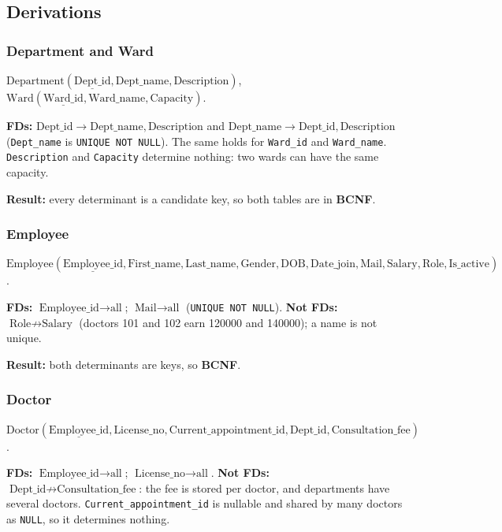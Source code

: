 \documentclass[11pt,a4paper]{article}
\newcommand{\code}[1]{\texttt{#1}}
\begin{document}
\subsection{Derivations}

\subsubsection*{Department and Ward}
$\text{Department}(\underline{\text{Dept\_id}}, \text{Dept\_name}, \text{Description})$, $\text{Ward}(\underline{\text{Ward\_id}}, \text{Ward\_name}, \text{Capacity})$.

\textbf{FDs:} $\text{Dept\_id} \rightarrow \text{Dept\_name}, \text{Description}$ and $\text{Dept\_name} \rightarrow \text{Dept\_id}, \text{Description}$ (\code{Dept\_name} is \code{UNIQUE NOT NULL}). The same holds for \code{Ward\_id} and \code{Ward\_name}. \code{Description} and \code{Capacity} determine nothing: two wards can have the same capacity.

\textbf{Result:} every determinant is a candidate key, so both tables are in \textbf{BCNF}.

\subsubsection*{Employee}
$\text{Employee}(\underline{\text{Employee\_id}}, \text{First\_name}, \text{Last\_name}, \text{Gender}, \text{DOB}, \text{Date\_join}, \text{Mail}, \text{Salary}, \text{Role}, \text{Is\_active})$.

\textbf{FDs:} $\text{Employee\_id} \rightarrow \text{all}$; $\text{Mail} \rightarrow \text{all}$ (\code{UNIQUE NOT NULL}).
\textbf{Not FDs:} $\text{Role} \nrightarrow \text{Salary}$ (doctors 101 and 102 earn 120000 and 140000); a name is not unique.

\textbf{Result:} both determinants are keys, so \textbf{BCNF}.

\subsubsection*{Doctor}
$\text{Doctor}(\underline{\text{Employee\_id}}, \text{License\_no}, \text{Current\_appointment\_id}, \text{Dept\_id}, \text{Consultation\_fee})$.

\textbf{FDs:} $\text{Employee\_id} \rightarrow \text{all}$; $\text{License\_no} \rightarrow \text{all}$.
\textbf{Not FDs:} $\text{Dept\_id} \nrightarrow \text{Consultation\_fee}$: the fee is stored per doctor, and departments have several doctors. \code{Current\_appointment\_id} is nullable and shared by many doctors as \code{NULL}, so it determines nothing.
\end{document}
